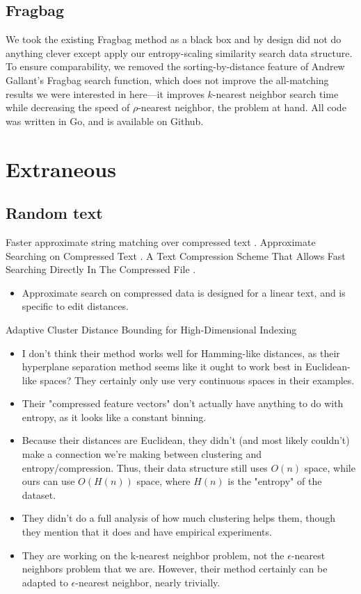 \documentclass[review,preprint,12pt]{elsarticle}
\theoremstyle{definition}
\theoremstyle{remark}
\numberwithin{equation}{section}
\begin{document}
\subsection{Fragbag}
We took the existing Fragbag method as a black box and by design did not do anything clever except apply our entropy-scaling similarity search data structure.
To ensure comparability, we removed the sorting-by-distance feature of Andrew Gallant's Fragbag search function, which does not improve the all-matching results we were interested in here---it improves $k$-nearest neighbor search time while decreasing the speed of $\rho$-nearest neighbor, the problem at hand.
All code was written in Go, and is available on Github.


%



\appendix
\section{Extraneous}
\subsection{Random text}

Faster approximate string matching over compressed text \cite{navarro2001faster}.
Approximate Searching on Compressed Text \cite{perez2005approximate}.
A Text Compression Scheme That Allows Fast Searching Directly In The Compressed File \cite{manber93atext}.
\begin{itemize}
\item Approximate search on compressed data is designed for a linear text, and is specific to edit distances.
\end{itemize}

Adaptive Cluster Distance Bounding for High-Dimensional Indexing \cite{ramaswamy2011adaptive}
\begin{itemize}
\item I don't think their method works well for Hamming-like distances, as
   their hyperplane separation method seems like it ought to work best
   in Euclidean-like spaces? They certainly only use very continuous
   spaces in their examples.
\item Their "compressed feature vectors" don't actually have anything to do
   with entropy, as it looks like a constant binning.
\item Because their distances are Euclidean, they didn't (and most likely
   couldn't) make a connection we're making between clustering and
   entropy/compression. Thus, their data structure still uses $O(n)$
   space, while ours can use $O(H(n))$ space, where $H(n)$ is the "entropy"
   of the dataset.
\item They didn't do a full analysis of how much clustering helps them,
   though they mention that it does and have empirical experiments.
\item They are working on the k-nearest neighbor problem, not the
   $\epsilon$-nearest neighbors problem that we are. However, their method
   certainly can be adapted to $\epsilon$-nearest neighbor, nearly
   trivially.
\end{itemize}
\end{document}
